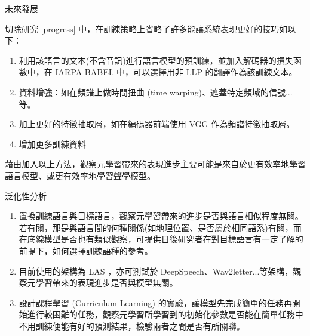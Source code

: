 \documentclass[12pt,UTF8,fntef]{article}
\begin{document}
\begin{section}{未來發展}
  \begin{subsection}{切除研究}
    \ref{progress} 中，在訓練策略上省略了許多能讓系統表現更好的技巧如以下：
    \begin{enumerate}[itemsep=-2mm]
      \item 利用該語言的文本(不含音訊)進行語言模型的預訓練，並加入解碼器的損失函數中，在 IARPA-BABEL 中，可以選擇用非 LLP 的翻譯作為該訓練文本。
      \item 資料增強：如在頻譜上做時間扭曲 (time warping)、遮蓋特定頻域的信號...等。
      \item 加上更好的特徵抽取層，如在編碼器前端使用 VGG 作為頻譜特徵抽取層。
      \item 增加更多訓練資料
    \end{enumerate}
    藉由加入以上方法，觀察元學習帶來的表現進步主要可能是來自於更有效率地學習語言模型、或更有效率地學習聲學模型。
  \end{subsection}

  \begin{subsection}{泛化性分析}
    \begin{enumerate}[itemsep=-1mm]
      \item 置換訓練語言與目標語言，觀察元學習帶來的進步是否與語言相似程度無關。若有關，那是與語言間的何種關係(如地理位置、是否屬於相同語系)有關，而在底線模型是否也有類似觀察，可提供日後研究者在對目標語言有一定了解的前提下，如何選擇訓練語種的參考。
      \item 目前使用的架構為 LAS \cite{chan2016listen}，亦可測試於 DeepSpeech、Wav2letter...等架構，觀察元學習帶來的表現進步是否與模型無關。
      \item 設計課程學習 (Curriculum Learning) 的實驗，讓模型先完成簡單的任務再開始進行較困難的任務，觀察元學習所學習到的初始化參數是否能在簡單任務中不用訓練便能有好的預測結果，檢驗兩者之間是否有所關聯。
    \end{enumerate}   
  \end{subsection}
\end{section}



\end{document}
